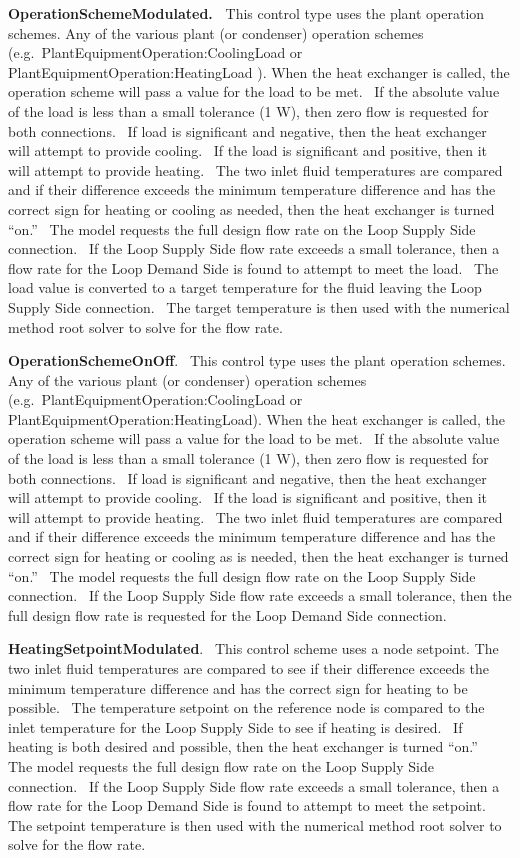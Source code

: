 \textbf{OperationSchemeModulated.~} This control type uses the plant operation schemes. Any of the various plant (or condenser) operation schemes (e.g.~PlantEquipmentOperation:CoolingLoad or PlantEquipmentOperation:HeatingLoad ). When the heat exchanger is called, the operation scheme will pass a value for the load to be met.~ If the absolute value of the load is less than a small tolerance (1 W), then zero flow is requested for both connections.~ If load is significant and negative, then the heat exchanger will attempt to provide cooling.~ If the load is significant and positive, then it will attempt to provide heating.~ The two inlet fluid temperatures are compared and if their difference exceeds the minimum temperature difference and has the correct sign for heating or cooling as needed, then the heat exchanger is turned ``on.''~ The model requests the full design flow rate on the Loop Supply Side connection.~ If the Loop Supply Side flow rate exceeds a small tolerance, then a flow rate for the Loop Demand Side is found to attempt to meet the load.~ The load value is converted to a target temperature for the fluid leaving the Loop Supply Side connection.~ The target temperature is then used with the numerical method root solver to solve for the flow rate.

\textbf{OperationSchemeOnOff}.~ This control type uses the plant operation schemes. Any of the various plant (or condenser) operation schemes (e.g.~PlantEquipmentOperation:CoolingLoad or PlantEquipmentOperation:HeatingLoad). When the heat exchanger is called, the operation scheme will pass a value for the load to be met.~ If the absolute value of the load is less than a small tolerance (1 W), then zero flow is requested for both connections.~ If load is significant and negative, then the heat exchanger will attempt to provide cooling.~ If the load is significant and positive, then it will attempt to provide heating.~ The two inlet fluid temperatures are compared and if their difference exceeds the minimum temperature difference and has the correct sign for heating or cooling as is needed, then the heat exchanger is turned ``on.''~ The model requests the full design flow rate on the Loop Supply Side connection.~ If the Loop Supply Side flow rate exceeds a small tolerance, then the full design flow rate is requested for the Loop Demand Side connection.

\textbf{HeatingSetpointModulated}.~ This control scheme uses a node setpoint. The two inlet fluid temperatures are compared to see if their difference exceeds the minimum temperature difference and has the correct sign for heating to be possible.~ The temperature setpoint on the reference node is compared to the inlet temperature for the Loop Supply Side to see if heating is desired.~ If heating is both desired and possible, then the heat exchanger is turned ``on.''~ The model requests the full design flow rate on the Loop Supply Side connection.~ If the Loop Supply Side flow rate exceeds a small tolerance, then a flow rate for the Loop Demand Side is found to attempt to meet the setpoint.~ The setpoint temperature is then used with the numerical method root solver to solve for the flow rate.

